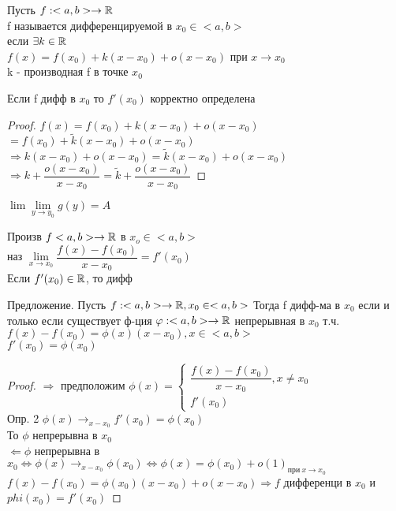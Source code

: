 
\begin{definition}
	Пусть $ f : <a, b> \rightarrow \mathbb{R} $ \\
	f называется дифференцируемой в $ x_0 \in <a, b> $ \\
	если $ \exists k \in \mathbb{R} $ \\
	$ f(x) = f(x_0) + k(x - x_0) + o(x - x_0) $ при $ x \rightarrow x_0 $\\
	k - производная f в точке $ x_0 $
	\begin{lemma}
		Если f дифф в $ x_0 $ то $ f'(x_0) $ корректно определена 
		\begin{proof}
			$ f(x) = f(x_0) + k(x - x_0) + o(x - x_0) $ \\
			$ = f(x_0) + \tilde{k}(x - x_0) + o(x - x_0) $ \\
			$ \Rightarrow k(x-x_0) + o(x-x_0) = \tilde{k} (x -x_0) + o(x-x_0) $\\
			$ \Rightarrow k+\dfrac{o(x-x_0)}{x - x_0} = \tilde{k} + \dfrac{o(x-x_0)}{x-x_0} $ 
		\end{proof}$ \lim\lim\limits_{y \rightarrow y_0} g(y) = A $\\
	\end{lemma}
\end{definition}
\begin{definition}
	Произв $ f<a,b> \rightarrow \mathbb{R} $ в $ x_o \in <a,b> $ \\
	наз $ \lim\limits_{x \rightarrow x_0} \dfrac{f(x) - f(x_0)}{x - x_0} = f'(x_0) $ \\
	Если $ f'(x_0) \in \mathbb{R}$, то дифф 
\end{definition}

Предложение. Пусть $ f : <a, b> \rightarrow \mathbb{R}, x_0 \in <a, b> $ Тогда f дифф-ма в $x_0$ если и только если существует ф-ция $ \varphi : <a,b> \rightarrow \mathbb{R} $ непрерывная в $x_0$ т.ч. $ f(x) - f(x_0) = \phi(x) (x-x_0), x \in <a,b> $ \\
$ f'(x_0) = \phi(x_0) $\\
\begin{proof} 
	$\Rightarrow$ предположим $ \phi(x) = \left\{ \begin{array}{ll}
		 \dfrac{f(x) - f(x_0)}{x - x_0}, x \neq x_0 \\
		 f'(x_0)
	\end{array} \right. $ \\
	Опр. 2 $ \phi(x) \rightarrow_{x - x_0} f'(x_0) = \phi(x_0) $\\
	То $\phi$ непрерывна в $x_0$ \\
	$\Leftarrow \phi$ непрерывна в $ x_0 \Leftrightarrow \phi(x) \rightarrow_{x - x_0} \phi(x_0) \Leftrightarrow \phi(x)  = \phi(x_0) + o(1)_{\text{при} \ x \rightarrow x_0} $ \\
	$ f(x) - f(x_0) = \phi(x_0) (x - x_0) + o(x-x_0) \Rightarrow f $ дифференци в $ x_0 $ и $phi(x_0) = f'(x_0) $    
\end{proof} 

